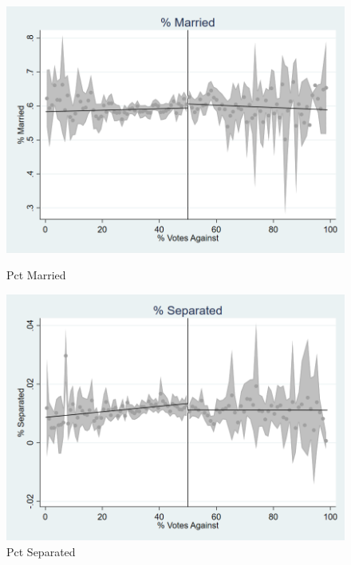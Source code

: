 \begin{figure}[ht]
    \centering
    \begin{minipage}[b]{0.40\textwidth}
        \centering
        \includegraphics[width=\textwidth,keepaspectratio]{images/cov_smoothness_pctmarried.png}
        \caption*{Pct Married}
        \label{fig:pctmarried_sm}
    \end{minipage}
    \hfill
    \begin{minipage}[b]{0.40\textwidth}
        \centering
        \includegraphics[width=\textwidth,keepaspectratio]{images/cov_smoothness_pctseparated.png}
        \caption*{Pct Separated}
        \label{fig:pctseparated_sm}
    \end{minipage}
    
    \vspace{1em}
    

\end{figure}

